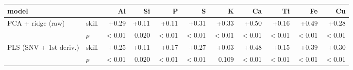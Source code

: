 \begin{tabular}{llrrrrrrrrr}
\toprule
model & & Al & Si & P & S & K & Ca & Ti & Fe & Cu \\
\midrule
PCA + ridge (raw) & skill & +0.29 & +0.11 & +0.11 & +0.31 & +0.33 & +0.50 & +0.16 & +0.49 & +0.28 \\
 & $p$ & $<$0.01 & 0.020 & $<$0.01 & $<$0.01 & $<$0.01 & $<$0.01 & $<$0.01 & $<$0.01 & $<$0.01 \\
PLS (SNV + 1st deriv.) & skill & +0.25 & +0.11 & +0.17 & +0.27 & +0.03 & +0.48 & +0.15 & +0.39 & +0.30 \\
 & $p$ & $<$0.01 & 0.020 & $<$0.01 & $<$0.01 & 0.109 & $<$0.01 & $<$0.01 & $<$0.01 & $<$0.01 \\
\bottomrule
\end{tabular}
